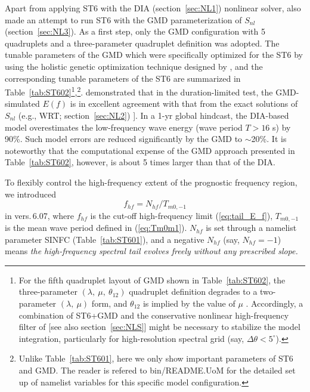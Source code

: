 Apart from applying {\code ST6} with the {\code DIA} (section~\ref{sec:NL1}) nonlinear solver, \citet{Liu2019}
also made an attempt to run {\code ST6} with the {\code GMD} parameterization of $S_{nl}$
(section~\ref{sec:NL3}). As a first step, only the {\code GMD} configuration with
5 quadruplets and a three-parameter quadruplet definition
\citep[i.e., {\code G35} in][]{tol:OMOD13d} was adopted. The tunable parameters
of the {\code GMD} which were specifically optimized for the {\code ST6} by using the holistic
genetic optimization technique designed by \citet{tol:OMOD13e}, and the
corresponding tunable parameters of the {\code ST6} are summarized in
Table~\ref{tab:ST602}\footnote{For the fifth quadruplet layout of {\code GMD} shown
in Table~\ref{tab:ST602}, the three-parameter $(\lambda,\ \mu,\ \theta_{12})$
quadruplet definition degrades to a two-parameter $(\lambda,\ \mu)$ form, and
$\theta_{12}$ is implied by the value of $\mu$ \citep{tol:OMOD13d}. Accordingly,
a combination of {\code ST6+GMD} and the conservative nonlinear high-frequency
filter of \citet{tol:OMOD11} [see also section~\ref{sec:NLS}] might be
necessary to stabilize the model integration, particularly for high-resolution
spectral grid (say, $\Delta \theta < 5^{\circ}$).},\footnote{Unlike
Table~\ref{tab:ST601}, here we only show important parameters of {\code ST6} and
{\code GMD}. The reader is refered to {\code bin/README.UoM} for the detailed
set up of namelist variables for this specific model configuration.}.
\citet{Liu2019} demonstrated that in the duration-limited test, the
{\code GMD}-simulated $E(f)$ is in excellent agreement with that from the exact
 solutions of $S_{nl}$ (e.g., {\code WRT}; section~\ref{sec:NL2}) \citep[see also][]{tol:OMOD13d}]. In a 1-yr global
hindcast, the {\code DIA}-based model overestimates the low-frequency wave energy
(wave period $T > 16$ s) by 90\%. Such model errors are reduced significantly
by the {\code GMD} to $\sim$20\%. It is noteworthy that the computational expense
of the {\code GMD} approach presented in Table~\ref{tab:ST602}, however, is about
5 times larger than that of the {\code DIA}.

To flexibly control the high-frequency extent of the prognostic frequency
region, we introduced
\begin{equation}
f_{hf} = N_{hf}/T_{m0, -1}
\end{equation}
in vers.\,6.07, where $f_{hf}$ is the cut-off high-frequency limit
(\ref{eq:tail_E_f}), $T_{m0,-1}$ is the mean wave period defined in
(\ref{eq:Tm0m1}). $N_{hf}$ is set through a namelist parameter SINFC
(Table~\ref{tab:ST601}), and a negative $N_{hf}$ (say, $N_{hf} = -1$)
means \emph{the high-frequency spectral tail evolves freely without any
prescribed slope.}

